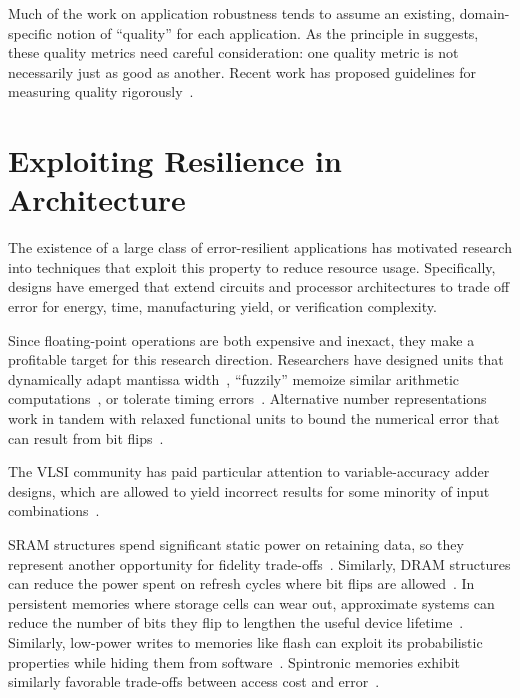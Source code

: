Much of the work on application robustness tends to assume an existing,
domain-specific notion of ``quality'' for each
application.
As the principle in  suggests, these quality metrics
need careful consideration: one quality metric is not necessarily just as good
as another.
Recent work has proposed guidelines for measuring quality
rigorously~\cite{wddd-quality}.


\section{Exploiting Resilience in Architecture}

The existence of a large class of error-resilient applications has motivated
research into techniques that exploit this property to reduce resource usage.
Specifically, designs have emerged that extend circuits and processor
architectures to trade off error for energy, time, manufacturing yield, or
verification complexity.

Since floating-point operations are both expensive and inexact, they make a
profitable target for this research direction. Researchers have designed units
that dynamically adapt mantissa width~\cite{bitwidthred, hierarchfpu}, ``fuzzily'' memoize
similar arithmetic computations~\cite{fuzzymemo}, or tolerate timing
errors~\cite{kumarhpca, hizli, metafunctions}.
Alternative number
representations work in tandem with relaxed functional units to bound the
numerical error that can result from bit flips~\cite{stanleymarbell}.

The VLSI community has paid particular attention to variable-accuracy adder
designs, which are allowed to yield incorrect results for some minority of
input combinations~\cite{uva-adder, palem-adders, impact, adder-metrics,
configurable-adder, adder-iccad13, adder-tcad, adder-optimal, adder-dac12,
adder-isic09, adder-date08}.

SRAM
structures spend significant static power on retaining data, so they represent
another opportunity for fidelity trade-offs~\cite{hybrid-sram, sramerrors,
partially-forgetful}. Similarly,
DRAM structures can reduce the power spent on refresh cycles where bit flips
are allowed~\cite{flikker, sparkk}.
In persistent memories where storage cells can wear out, approximate systems
can reduce the number of bits they flip to lengthen the useful device
lifetime~\cite{fang-pcm}.
Similarly, low-power writes to memories like flash can exploit its
probabilistic properties while hiding them from software~\cite{halfwits,
powerfade, flash-retention-relax}.
Spintronic memories exhibit similarly favorable trade-offs between access cost
and error~\cite{spintronic-approx}.

